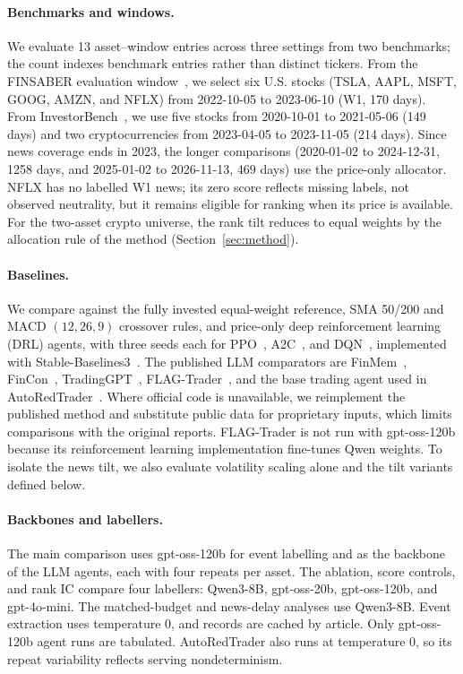 \paragraph{Benchmarks and windows.}
We evaluate 13 asset--window entries across three settings from two benchmarks; the count indexes benchmark entries rather than distinct tickers. From the FINSABER evaluation window~\cite{li2025finsaber}, we select six U.S. stocks (TSLA, AAPL, MSFT, GOOG, AMZN, and NFLX) from 2022-10-05 to 2023-06-10 (W1, 170 days). From InvestorBench~\cite{li2024investorbench}, we use five stocks from 2020-10-01 to 2021-05-06 (149 days) and two cryptocurrencies from 2023-04-05 to 2023-11-05 (214 days). Since news coverage ends in 2023, the longer comparisons (2020-01-02 to 2024-12-31, 1258 days, and 2025-01-02 to 2026-11-13, 469 days) use the price-only allocator. NFLX has no labelled W1 news; its zero score reflects missing labels, not observed neutrality, but it remains eligible for ranking when its price is available. For the two-asset crypto universe, the rank tilt reduces to equal weights by the allocation rule of the method (Section~\ref{sec:method}).

\paragraph{Baselines.}
We compare against the fully invested equal-weight reference, SMA 50/200 and MACD $(12,26,9)$ crossover rules, and price-only deep reinforcement learning (DRL) agents, with three seeds each for PPO~\cite{schulman2017ppo}, A2C~\cite{mnih2016a3c}, and DQN~\cite{mnih2015dqn}, implemented with Stable-Baselines3~\cite{raffin2021sb3}. The published LLM comparators are FinMem~\cite{yu2024finmem}, FinCon~\cite{yu2024fincon}, TradingGPT~\cite{li2023tradinggpt}, FLAG-Trader~\cite{wang2025flagtrader}, and the base trading agent used in AutoRedTrader~\cite{liu2026autoredtrader}. Where official code is unavailable, we reimplement the published method and substitute public data for proprietary inputs, which limits comparisons with the original reports. FLAG-Trader is not run with gpt-oss-120b because its reinforcement learning implementation fine-tunes Qwen weights. To isolate the news tilt, we also evaluate volatility scaling alone and the tilt variants defined below.

\paragraph{Backbones and labellers.}
The main comparison uses gpt-oss-120b for event labelling and as the backbone of the LLM agents, each with four repeats per asset. The ablation, score controls, and rank IC compare four labellers: Qwen3-8B, gpt-oss-20b, gpt-oss-120b, and gpt-4o-mini. The matched-budget and news-delay analyses use Qwen3-8B. Event extraction uses temperature $0$, and records are cached by article. Only gpt-oss-120b agent runs are tabulated. AutoRedTrader also runs at temperature $0$, so its repeat variability reflects serving nondeterminism.

